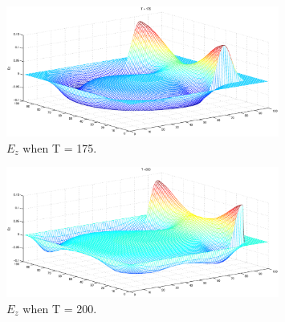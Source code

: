 \documentclass[9pt,a4paper]{article}
\begin{document}
\begin{figure}
\centering
\includegraphics[angle=270,
    width=0.8\textwidth]{ez.175.eps}
\caption{$E_z$ when T = 175.}
\label{pic:ez175}
\end{figure}

\begin{figure}
\centering
\includegraphics[angle=270,
    width=0.8\textwidth]{ez.200.eps}
\caption{$E_z$ when T = 200.}
\label{pic:ez200}
\end{figure}
\end{document}
